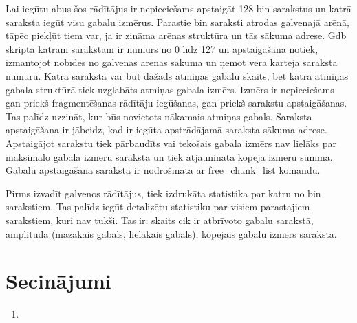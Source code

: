 Lai iegūtu abus šos rādītājus ir nepieciešams apstaigāt 128 bin sarakstus un katrā saraksta iegūt visu gabalu izmērus.
Parastie bin saraksti atrodas galvenajā arēnā, tāpēc piekļūt tiem var, ja ir zināma arēnas struktūra un tās sākuma adrese.
Gdb skriptā katram sarakstam ir numurs no 0 līdz 127 un apstaigāšana notiek, izmantojot nobīdes no galvenās arēnas sākuma un ņemot vērā kārtējā saraksta numuru.
Katra sarakstā var būt dažāds atmiņas gabalu skaits, bet katra atmiņas gabala struktūrā tiek uzglabāts atmiņas gabala izmērs.
Izmērs ir nepieciešams gan priekš fragmentēšanas rādītāju iegūšanas, gan priekš sarakstu apstaigāšanas. 
Tas palīdz uzzināt, kur būs novietots nākamais atmiņas gabals.
Saraksta apstaigāšana ir jābeidz, kad ir iegūta apstrādājamā saraksta sākuma adrese.
Apstaigājot sarakstu tiek pārbaudīts vai tekošais gabala izmērs nav lielāks par maksimālo gabala izmēru sarakstā un tiek atjaunināta kopējā izmēru summa.
Gabalu apstaigāšana sarakstā ir nodrošināta ar free\_chunk\_list komandu.

Pirms izvadīt galvenos rādītājus, tiek izdrukāta statistika par katru no bin sarakstiem. 
Tas palīdz iegūt detalizētu statistiku par visiem parastajiem sarakstiem, kuri nav tukši.
Tas ir: skaits cik ir atbrīvoto gabalu sarakstā, amplitūda (mazākais gabals, lielākais gabals), kopējais gabalu izmērs sarakstā.


\section{Secinājumi}
\begin{enumerate}
\item 
\end{enumerate}


